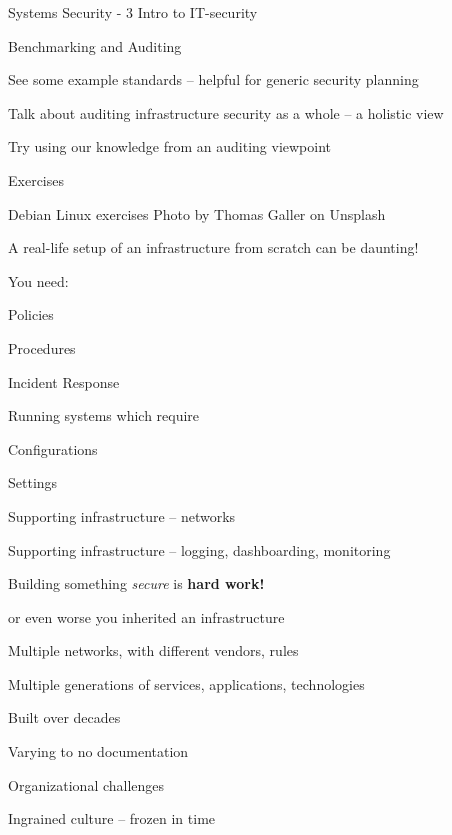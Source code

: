 \documentclass[Screen16to9,17pt]{foils}
\begin{document}
\mytitlepage
{Systems Security - 3}
{Intro to IT-security \the\year}

\hlkprofiluk




\begin{list2}
\item Benchmarking and Auditing
\item See some example standards -- helpful for generic security planning
\item Talk about auditing infrastructure security as a whole -- a holistic view
\item Try using our knowledge from an auditing viewpoint
\end{list2}

Exercises
\begin{list2}
\item Debian Linux exercises {\small\hfill{\small\hfill  Photo by Thomas Galler on Unsplash}}
\end{list2}




\begin{list1}
\item A real-life setup of an infrastructure from scratch can be daunting!
\item You need:
\begin{list2}
\item Policies
\item Procedures
\item Incident Response
\end{list2}
\item Running systems which require
\begin{list2}
\item Configurations
\item Settings
\item Supporting infrastructure -- networks
\item Supporting infrastructure -- logging, dashboarding, monitoring
\end{list2}
\item Building something \emph{secure} is {\bf hard work!}
\end{list1}




\begin{list1}
\item or even worse you inherited an infrastructure
\item Multiple networks, with different vendors, rules
\item Multiple generations of services, applications, technologies
\item Built over decades
\item Varying to no documentation
\item Organizational challenges
\item Ingrained culture -- frozen in time
\end{list1}
\end{document}

